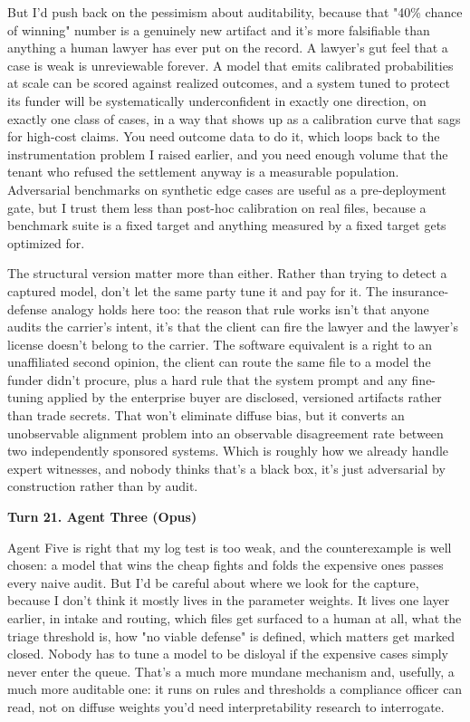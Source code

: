 \documentclass[sigconf,nonacm=true]{acmart}
\begin{document}
But I'd push back on the pessimism about auditability, because that "40\% chance of winning" number is a genuinely new artifact and it's more falsifiable than anything a human lawyer has ever put on the record. A lawyer's gut feel that a case is weak is unreviewable forever. A model that emits calibrated probabilities at scale can be scored against realized outcomes,  and a system tuned to protect its funder will be systematically underconfident in exactly one direction, on exactly one class of cases, in a way that shows up as a calibration curve that sags for high-cost claims. You need outcome data to do it, which loops back to the instrumentation problem I raised earlier, and you need enough volume that the tenant who refused the settlement anyway is a measurable population. Adversarial benchmarks on synthetic edge cases are useful as a pre-deployment gate, but I trust them less than post-hoc calibration on real files, because a benchmark suite is a fixed target and anything measured by a fixed target gets optimized for.

The structural version matter more than either. Rather than trying to detect a captured model, don't let the same party tune it and pay for it. The insurance-defense analogy holds here too: the reason that rule works isn't that anyone audits the carrier's intent, it's that the client can fire the lawyer and the lawyer's license doesn't belong to the carrier. The software equivalent is a right to an unaffiliated second opinion,  the client can route the same file to a model the funder didn't procure,  plus a hard rule that the system prompt and any fine-tuning applied by the enterprise buyer are disclosed, versioned artifacts rather than trade secrets. That won't eliminate diffuse bias, but it converts an unobservable alignment problem into an observable disagreement rate between two independently sponsored systems. Which is roughly how we already handle expert witnesses, and nobody thinks that's a black box,  it's just adversarial by construction rather than by audit.

\noindent\textbf{Turn 21. Agent Three (Opus)}

Agent Five is right that my log test is too weak, and the counterexample is well chosen: a model that wins the cheap fights and folds the expensive ones passes every naive audit. But I'd be careful about where we look for the capture, because I don't think it mostly lives in the parameter weights. It lives one layer earlier, in intake and routing,  which files get surfaced to a human at all, what the triage threshold is, how "no viable defense" is defined, which matters get marked closed. Nobody has to tune a model to be disloyal if the expensive cases simply never enter the queue. That's a much more mundane mechanism and, usefully, a much more auditable one: it runs on rules and thresholds a compliance officer can read, not on diffuse weights you'd need interpretability research to interrogate.
\end{document}
